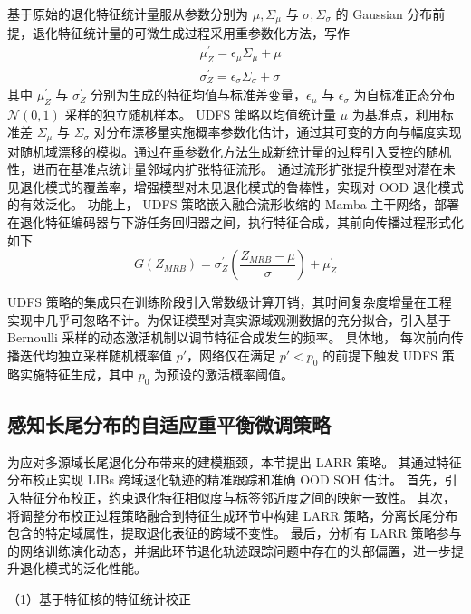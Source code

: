 基于原始的退化特征统计量服从参数分别为 $\mu, \Sigma_{\mu}$ 与 $\sigma, \Sigma_{\sigma}$ 的 Gaussian 分布前提，退化特征统计量的可微生成过程采用重参数化方法，写作
% 
\begin{align}
    & \mu_{Z}^{\prime}=\epsilon_{\mu}\Sigma_{\mu}+\mu  \\
    & \sigma_{Z}^{\prime}=\epsilon_{\sigma}\Sigma_{\sigma}+\sigma
\end{align}
% 
其中 $\mu_{Z}^{\prime}$ 与 $\sigma_{Z}^{\prime}$ 分别为生成的特征均值与标准差变量，$\epsilon_{\mu}$ 与 $\epsilon_{\sigma}$ 为自标准正态分布 $\mathcal{N}(0,1)$ 采样的独立随机样本。
% 
UDFS 策略以均值统计量 $\mu$ 为基准点，利用标准差 $\Sigma_{\mu}$ 与 $\Sigma_{\sigma}$ 对分布漂移量实施概率参数化估计，通过其可变的方向与幅度实现对随机域漂移的模拟。通过在重参数化方法生成新统计量的过程引入受控的随机性，进而在基准点统计量邻域内扩张特征流形。
% 
通过流形扩张提升模型对潜在未见退化模式的覆盖率，增强模型对未见退化模式的鲁棒性，实现对 OOD 退化模式的有效泛化。
% 
功能上，
UDFS 策略嵌入融合流形收缩的 Mamba 主干网络，部署在退化特征编码器与下游任务回归器之间，执行特征合成，其前向传播过程形式化如下
% 
\begin{equation}
    G(Z_{MRB}) = \sigma_{Z}^{\prime}\left(\frac{Z_{MRB} - \mu}{\sigma}\right) + \mu_{Z}^{\prime}
    \label{UDFS}
\end{equation}

UDFS 策略的集成只在训练阶段引入常数级计算开销，其时间复杂度增量在工程实现中几乎可忽略不计。为保证模型对真实源域观测数据的充分拟合，引入基于 Bernoulli 采样的动态激活机制以调节特征合成发生的频率。
具体地，
每次前向传播迭代均独立采样随机概率值 $p'$，网络仅在满足 $p' < p_0$ 的前提下触发 UDFS 策略实施特征生成，其中 $p_0$ 为预设的激活概率阈值。

\subsection{感知长尾分布的自适应重平衡微调策略}\label{susbec:LARR}

为应对多源域长尾退化分布带来的建模瓶颈，本节提出 LARR 策略。
其通过特征分布校正实现 LIBs 跨域退化轨迹的精准跟踪和准确 OOD SOH 估计。
% 
首先，引入特征分布校正，约束退化特征相似度与标签邻近度之间的映射一致性。
% 
其次，将调整分布校正过程策略融合到特征生成环节中构建 LARR 策略，分离长尾分布包含的特定域属性，提取退化表征的跨域不变性。
% 
最后，分析有 LARR 策略参与的网络训练演化动态，并据此环节退化轨迹跟踪问题中存在的头部偏置，进一步提升退化模式的泛化性能。

（1）基于特征核的特征统计校正


